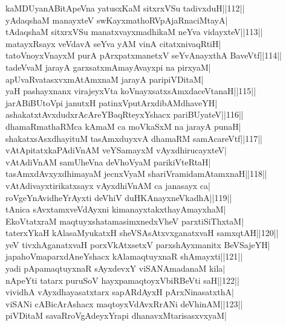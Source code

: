 \documentclass{article}
\begin{document}
kaMDUyanABitApeVna yatusxKaM sitxrxVSu tadivxduH||112||\\
yAdaqshaM manayxteV swKayxmathoRVpAjaRnaciMtayA|\\
tAdaqshaM sitxrxVSu manatxvayxmadhikaM neYva vidayxteV||113||\\
matayxRsayx veVdavA seYva yAM vinA citatxnivaqRtiH|\\
tatoVnoyxVnayxM purA pArxpatxmanetxV seYvAnayxthA BaveVtf||114||\\
tadeVvaM jarayA garxsatxmAmayAvayxpi na pirxyaM|\\
apUvaRvatasxvxmAtAmxnaM jarayA paripiVDitaM|\\
yaH pashayxnanx virajeyxVta koVnayxsatxsAmxdaceVtanaH||115||\\
jarABiBUtoVpi janutxH patinxVputArxdibAMdhaveYH|\\
ashakatxtAvxdudxrAcAreYBaqRteyxYshacx pariBUyateV||116||\\
dhamaRmathaRMca kAmaM ca moVkaSxM na jarayA punaH|\\
shakatxsAsxdhayituM tasAmxduyxvA dhamaRM samAcareVtf||117||\\
vAtApitatxkaPAdiVnAM veYSamayxM vAyxdhirucayxteV|\\
vAtAdiVnAM samUheVna deVhoVyaM parikiVteRtaH|\\
tasAmxdAvxyxdhimayaM jecnxVyaM shariVramidamAtamxnaH||118||\\
vAtAdivayxtirikatxsayx vAyxdhiVnAM ca janasayx ca|\\
roVgeYnAvidheYrAyxti deVhiV duHKAnayxneVkadhA||119||\\
tAnica sAvxtamxveVdAyxni kimanayxtakxthayAmayxhaM|\\
EkoVtatxraM maqtuyxshatamasimxnedxVheV parxtiSiThxtaM|\\
taterxYkaH kAlasaMyukatxH sheVSAsAtxvxganatxvaH samxqtAH||120||\\
yeV tivxhAganatxvaH porxVkAtxsetxV parxshAyxmanitx BeVSajeYH|\\
japahoVmaparxdAneYshacx kAlamaqtuyxnaR shAmayxti||121||\\
yadi pApamaqtuyxnaR sAyxdevxY viSANAmadanaM kila|\\
nApeYti tatarx puruSoV hayxpamaqtoyxVbiRBeVti saH||122||\\
vividhA vAyxdhayasatxtarx sapARdAyxH pArxNinasatxthA|\\
viSANi cABicArAshacx maqtoyxVdAvxRrANi deVhinAM||123||\\
piVDitaM savaRroVgAdeyxYrapi dhanavxMtarisasxvxyaM|\\
\end{document}
